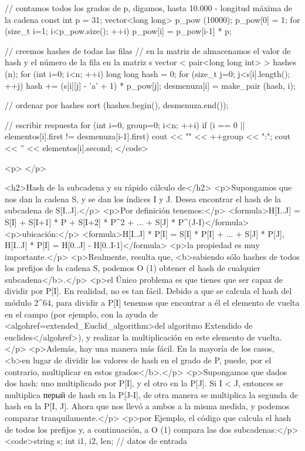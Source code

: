 // contamos todos los grados de p, digamos, hasta 10.000 - longitud máxima de la cadena
const int p = 31;
vector<long long> p_pow (10000);
p_pow[0] = 1;
for (size_t i=1; i<p_pow.size(); ++i)
p_pow[i] = p_pow[i-1] * p;

// creemos hashes de todas las filas
// en la matriz de almacenamos el valor de hash y el número de la fila en la matriz s
vector < pair<long long int> > hashes (n);
for (int i=0; i<n; ++i)
{
long long hash = 0;
for (size_t j=0; j<s[i].length(); ++j)
hash += (s[i][j] - 'a' + 1) * p_pow[j];
desmenuza[i] = make_pair (hash, i);
}

// ordenar por hashes
sort (hashes.begin(), desmenuza.end());

// escribir respuesta
for (int i=0, group=0; i<n; ++i)
{
if (i == 0 || elementos[i].first != desmenuza[i-1].first)
cout << "\nGroup " << ++group << ":";
cout << '' << elementos[i].second;
}</code>

<p> </p>

<h2>Hash de la subcadena y su rápido cálculo de</h2>
<p>Supongamos que nos dan la cadena S, y se dan los índices I y J. Desea encontrar el hash de la subcadena de S[I..J].</p>
<p>Por definición tenemos:</p>
<formula>H[I..J] = S[I] + S[I+1] * P + S[I+2] * P^2 + ... + S[J] * P^(J-I)</formula>
<p>ubicación:</p>
<formula>H[I..J] * P[I] = S[I] * P[I] + ... + S[J] * P[J],
H[I..J] * P[I] = H[0..J] - H[0..I-1]</formula>
<p>la propiedad es muy importante.</p>
<p>Realmente, resulta que, <b>sabiendo sólo hashes de todos los prefijos de la cadena S, podemos O (1) obtener el hash de cualquier subcadena</b>.</p>
<p>el Único problema es que tienes que ser capaz de dividir por P[I]. En realidad, no es tan fácil. Debido a que se calcula el hash del módulo 2^64, para dividir a P[I] tenemos que encontrar a él el elemento de vuelta en el campo (por ejemplo, con la ayuda de <algohref=extended_Euclid_algorithm>del algoritmo Extendido de euclides</algohref>), y realizar la multiplicación en este elemento de vuelta.</p>
<p>Además, hay una manera más fácil. En la mayoría de los casos, <b>en lugar de dividir los valores de hash en el grado de P, puede, por el contrario, multiplicar en estos grados</b>.</p>
<p>Supongamos que dados dos hash: uno multiplicado por P[I], y el otro en la P[J]. Si I < J, entonces se multiplica перый de hash en la P[J-I], de otra manera se multiplica la segunda de hash en la P[I, J]. Ahora que nos llevó a ambos a la misma medida, y podemos comparar tranquilamente.</p>
<p>por Ejemplo, el código que calcula el hash de todos los prefijos y, a continuación, a O (1) compara las dos subcadenas:</p>
<code>string s; int i1, i2, len; // datos de entrada

